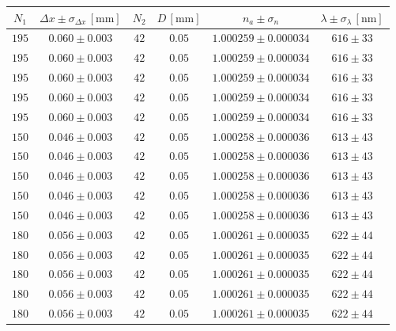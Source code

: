 \documentclass[]{article}
\begin{document}
\begin{table}[H]
    \centering
    
    \begin{tabular}{||c|c||c|c||c|c||}

        \hline
        $N_1$ & $\Delta x \pm \sigma_{\Delta x} \, [\text{mm}]$ & $N_2$ & $D \, [\text{mm}]$ & $n_a \pm \sigma_n$ & $\lambda \pm \sigma_{\lambda} \, [\text{nm}]$ \\
        \hline\hline

        $195$ & $0.060 \pm 0.003$ & $42$ & $0.05$ & $1.000259 \pm 0.000034$ & $616 \pm 33$ \\\hline
        $195$ & $0.060 \pm 0.003$ & $42$ & $0.05$ & $1.000259 \pm 0.000034$ & $616 \pm 33$ \\\hline
        $195$ & $0.060 \pm 0.003$ & $42$ & $0.05$ & $1.000259 \pm 0.000034$ & $616 \pm 33$ \\\hline
        $195$ & $0.060 \pm 0.003$ & $42$ & $0.05$ & $1.000259 \pm 0.000034$ & $616 \pm 33$ \\\hline
        $195$ & $0.060 \pm 0.003$ & $42$ & $0.05$ & $1.000259 \pm 0.000034$ & $616 \pm 33$ \\\hline
        \hline
        $150$ & $0.046 \pm 0.003$ & $42$ & $0.05$ & $1.000258 \pm 0.000036$ & $613 \pm 43$ \\\hline
        $150$ & $0.046 \pm 0.003$ & $42$ & $0.05$ & $1.000258 \pm 0.000036$ & $613 \pm 43$ \\\hline
        $150$ & $0.046 \pm 0.003$ & $42$ & $0.05$ & $1.000258 \pm 0.000036$ & $613 \pm 43$ \\\hline
        $150$ & $0.046 \pm 0.003$ & $42$ & $0.05$ & $1.000258 \pm 0.000036$ & $613 \pm 43$ \\\hline
        $150$ & $0.046 \pm 0.003$ & $42$ & $0.05$ & $1.000258 \pm 0.000036$ & $613 \pm 43$ \\\hline
        \hline
        $180$ & $0.056 \pm 0.003$ & $42$ & $0.05$ & $1.000261 \pm 0.000035$ & $622 \pm 44$ \\\hline
        $180$ & $0.056 \pm 0.003$ & $42$ & $0.05$ & $1.000261 \pm 0.000035$ & $622 \pm 44$ \\\hline
        $180$ & $0.056 \pm 0.003$ & $42$ & $0.05$ & $1.000261 \pm 0.000035$ & $622 \pm 44$ \\\hline
        $180$ & $0.056 \pm 0.003$ & $42$ & $0.05$ & $1.000261 \pm 0.000035$ & $622 \pm 44$ \\\hline
        $180$ & $0.056 \pm 0.003$ & $42$ & $0.05$ & $1.000261 \pm 0.000035$ & $622 \pm 44$ \\\hline

\end{tabular}
\end{table}
\end{document}
